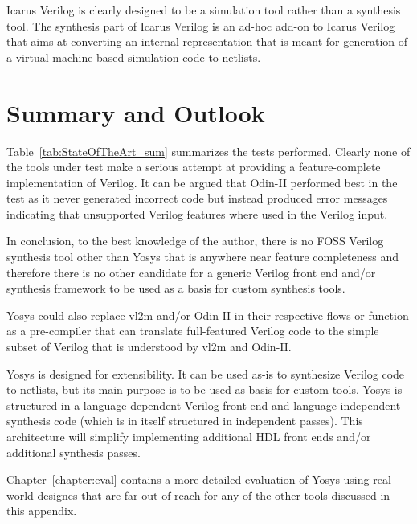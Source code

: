 Icarus Verilog is clearly designed to be a simulation tool rather than a
synthesis tool. The synthesis part of Icarus Verilog is an ad-hoc add-on to
Icarus Verilog that aims at converting an internal representation that is meant
for generation of a virtual machine based simulation code to netlists.

\section{Summary and Outlook}

Table~\ref{tab:StateOfTheArt_sum} summarizes the tests performed. Clearly none
of the tools under test make a serious attempt at providing a feature-complete
implementation of Verilog. It can be argued that Odin-II performed best in the
test as it never generated incorrect code but instead produced error messages
indicating that unsupported Verilog features where used in the Verilog input.

In conclusion, to the best knowledge of the author, there is no FOSS Verilog
synthesis tool other than Yosys that is anywhere near feature completeness and
therefore there is no other candidate for a generic Verilog front end and/or
synthesis framework to be used as a basis for custom synthesis tools.

Yosys could also replace vl2m and/or Odin-II in their respective flows or
function as a pre-compiler that can translate full-featured Verilog code to the
simple subset of Verilog that is understood by vl2m and Odin-II.

Yosys is designed for extensibility. It can be used as-is to synthesize Verilog
code to netlists, but its main purpose is to be used as basis for custom tools.
Yosys is structured in a language dependent Verilog front end and language
independent synthesis code (which is in itself structured in independent
passes). This architecture will simplify implementing additional HDL front
ends and/or additional synthesis passes.

Chapter~\ref{chapter:eval} contains a more detailed evaluation of Yosys using real-world
designes that are far out of reach for any of the other tools discussed in this appendix.

